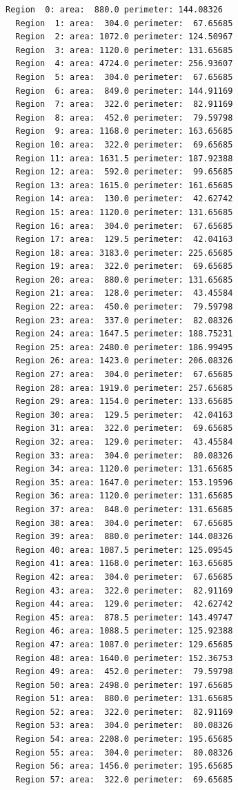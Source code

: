 \documentclass[]{IEEEtran}
\begin{document}
\begin{lstlisting}[language=sh, caption={Output for Extracted Properties for Image 1}, label={code:out-1-2}]
  Region  0: area:  880.0 perimeter: 144.08326 
  Region  1: area:  304.0 perimeter:  67.65685 
  Region  2: area: 1072.0 perimeter: 124.50967 
  Region  3: area: 1120.0 perimeter: 131.65685 
  Region  4: area: 4724.0 perimeter: 256.93607 
  Region  5: area:  304.0 perimeter:  67.65685 
  Region  6: area:  849.0 perimeter: 144.91169 
  Region  7: area:  322.0 perimeter:  82.91169 
  Region  8: area:  452.0 perimeter:  79.59798 
  Region  9: area: 1168.0 perimeter: 163.65685 
  Region 10: area:  322.0 perimeter:  69.65685 
  Region 11: area: 1631.5 perimeter: 187.92388 
  Region 12: area:  592.0 perimeter:  99.65685 
  Region 13: area: 1615.0 perimeter: 161.65685 
  Region 14: area:  130.0 perimeter:  42.62742 
  Region 15: area: 1120.0 perimeter: 131.65685 
  Region 16: area:  304.0 perimeter:  67.65685 
  Region 17: area:  129.5 perimeter:  42.04163 
  Region 18: area: 3183.0 perimeter: 225.65685 
  Region 19: area:  322.0 perimeter:  69.65685 
  Region 20: area:  880.0 perimeter: 131.65685 
  Region 21: area:  128.0 perimeter:  43.45584 
  Region 22: area:  450.0 perimeter:  79.59798 
  Region 23: area:  337.0 perimeter:  82.08326 
  Region 24: area: 1647.5 perimeter: 188.75231 
  Region 25: area: 2480.0 perimeter: 186.99495 
  Region 26: area: 1423.0 perimeter: 206.08326 
  Region 27: area:  304.0 perimeter:  67.65685 
  Region 28: area: 1919.0 perimeter: 257.65685 
  Region 29: area: 1154.0 perimeter: 133.65685 
  Region 30: area:  129.5 perimeter:  42.04163 
  Region 31: area:  322.0 perimeter:  69.65685 
  Region 32: area:  129.0 perimeter:  43.45584 
  Region 33: area:  304.0 perimeter:  80.08326 
  Region 34: area: 1120.0 perimeter: 131.65685 
  Region 35: area: 1647.0 perimeter: 153.19596 
  Region 36: area: 1120.0 perimeter: 131.65685 
  Region 37: area:  848.0 perimeter: 131.65685 
  Region 38: area:  304.0 perimeter:  67.65685 
  Region 39: area:  880.0 perimeter: 144.08326 
  Region 40: area: 1087.5 perimeter: 125.09545 
  Region 41: area: 1168.0 perimeter: 163.65685 
  Region 42: area:  304.0 perimeter:  67.65685 
  Region 43: area:  322.0 perimeter:  82.91169 
  Region 44: area:  129.0 perimeter:  42.62742 
  Region 45: area:  878.5 perimeter: 143.49747 
  Region 46: area: 1088.5 perimeter: 125.92388 
  Region 47: area: 1087.0 perimeter: 129.65685 
  Region 48: area: 1640.0 perimeter: 152.36753 
  Region 49: area:  452.0 perimeter:  79.59798 
  Region 50: area: 2498.0 perimeter: 197.65685 
  Region 51: area:  880.0 perimeter: 131.65685 
  Region 52: area:  322.0 perimeter:  82.91169 
  Region 53: area:  304.0 perimeter:  80.08326 
  Region 54: area: 2208.0 perimeter: 195.65685 
  Region 55: area:  304.0 perimeter:  80.08326 
  Region 56: area: 1456.0 perimeter: 195.65685 
  Region 57: area:  322.0 perimeter:  69.65685   
\end{lstlisting}
\end{document}
